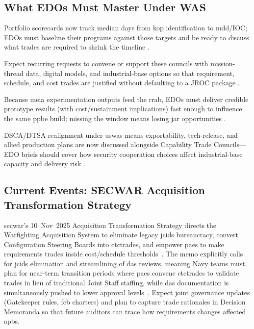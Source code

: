 \documentclass[../main.tex]{subfiles}
\begin{document}
\subsection{What EDOs Must Master Under WAS}
\begin{description}[style=nextline,labelsep=0.5em,font=\bfseries]
  \item[\textbf{Time-based metrics.}] Portfolio scorecards now track median days from \ac{kop} identification to \ac{mdd}/IOC; EDOs must baseline their programs against those targets and be ready to discuss what trades are required to shrink the timeline \autocite{secwar-was-memo-2025}.
  \item[\textbf{Capability Trade Councils.}] Expect recurring requests to convene or support these councils with mission-thread data, digital models, and industrial-base options so that requirement, schedule, and cost trades are justified without defaulting to a JROC package \autocite{secwar-acq-transformation-2025}.
  \item[\textbf{Experiment-to-budget pipeline.}] Because \ac{meia} experimentation outputs feed the \ac{rrab}, EDOs must deliver credible prototype results (with cost/sustainment implications) fast enough to influence the same \ac{ppbe} build; missing the window means losing \ac{jar} opportunities \autocite{secwar-jcids-reform-2025}.
  \item[\textbf{Security cooperation touchpoints.}] DSCA/DTSA realignment under \ac{uswas} means exportability, tech-release, and allied production plans are now discussed alongside Capability Trade Councils---EDO briefs should cover how security cooperation choices affect industrial-base capacity and delivery risk \autocite{secwar-arms-transfer-2025}.
\end{description}

\subsection{Current Events: SECWAR Acquisition Transformation Strategy}
\ac{secwar}'s 10~Nov~2025 Acquisition Transformation Strategy directs the Warfighting Acquisition System to eliminate legacy \ac{jcids} bureaucracy, convert Configuration Steering Boards into \acp{ctctrade}, and empower \acp{pae} to make requirements trades inside cost/schedule thresholds~\autocite{secwar-acq-transformation-2025}. The memo explicitly calls for \ac{jcids} elimination and streamlining of \ac{das} reviews, meaning Navy teams must plan for near-term transition periods where \acp{pae} convene \acp{ctctrade} to validate trades in lieu of traditional Joint Staff staffing, while \ac{das} documentation is simultaneously pushed to lower approval levels~\autocite{secwar-acq-transformation-2025}. Expect joint governance updates (Gatekeeper rules, \ac{fcb} charters) and plan to capture trade rationales in Decision Memoranda so that future auditors can trace how requirements changes affected \acp{apb}.

\end{document}
